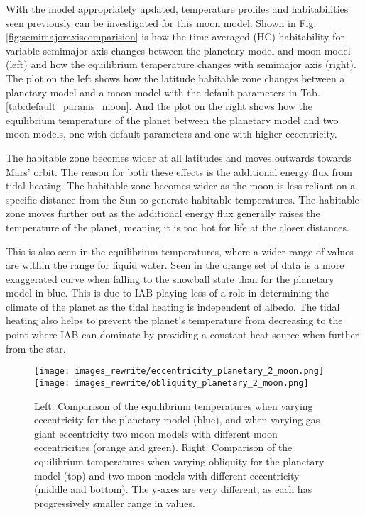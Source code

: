 \documentclass[12pt, onecolumn]{revtex4-2}    %
\begin{document}
With the model appropriately updated, temperature profiles and habitabilities seen previously can be investigated for this moon model.
Shown in Fig. \ref{fig:semimajoraxiscomparision} is how the time-averaged (HC) habitability for variable semimajor axis changes between the planetary model and moon model (left) and how the equilibrium temperature changes with semimajor axis (right). 
The plot on the left shows how the latitude habitable zone changes between a planetary model and a moon model with the default parameters in Tab. \ref{tab:default_params_moon}.
And the plot on the right shows how the equilibrium temperature of the planet between the planetary model and two moon models, one with default parameters and one with higher eccentricity.

The habitable zone becomes wider at all latitudes and moves outwards towards Mars' orbit.
The reason for both these effects is the additional energy flux from tidal heating.
The habitable zone becomes wider as the moon is less reliant on a specific distance from the Sun to generate habitable temperatures.
The habitable zone moves further out as the additional energy flux generally raises the temperature of the planet, meaning it is too hot for life at the closer distances.

This is also seen in the equilibrium temperatures, where a wider range of values are within the range for liquid water. 
Seen in the orange set of data is a more exaggerated curve when falling to the snowball state than for the planetary model in blue.
This is due to IAB playing less of a role in determining the climate of the planet as the tidal heating is independent of albedo.
The tidal heating also helps to prevent the planet's temperature from decreasing to the point where IAB can dominate by providing a constant heat source when further from the star.

\begin{figure}[t]
  \texttt{[image: images\_rewrite/eccentricity\_planetary\_2\_moon.png]}
  \texttt{[image: images\_rewrite/obliquity\_planetary\_2\_moon.png]}
  \caption{
    Left: Comparison of the equilibrium temperatures when varying eccentricity for the planetary model (blue), and when varying gas giant eccentricity two moon models with different moon eccentricities (orange and green).
    Right: Comparison of the equilibrium temperatures when varying obliquity for the planetary model (top) and two moon models with different eccentricity (middle and bottom).
    The y-axes are very different, as each has progressively smaller range in values.
  }
  \label{fig:eccentricity_obliquity_comparisions}
\end{figure}
\end{document}
